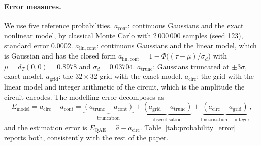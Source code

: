 \documentclass[pdflatex,sn-mathphys-num]{sn-jnl}%
\theoremstyle{thmstyleone}%
\theoremstyle{thmstyletwo}%
\theoremstyle{thmstylethree}%
\begin{document}
\paragraph{Error measures.} We use five reference probabilities. $a_{\mathrm{cont}}$: continuous Gaussians and the exact nonlinear model, by classical Monte Carlo with 2\,000\,000 samples (seed 123), standard error 0.0002. $a_{\mathrm{lin,cont}}$: continuous Gaussians and the linear model, which is Gaussian and has the closed form $a_{\mathrm{lin,cont}}=1-\Phi\bigl((\tau-\mu)/\sigma_d\bigr)$ with $\mu=d_T(0,0)=0.8978$ and $\sigma_d=0.03704$. $a_{\mathrm{trunc}}$: Gaussians truncated at $\pm3\sigma$, exact model. $a_{\mathrm{grid}}$: the $32\times32$ grid with the exact model. $a_{\mathrm{circ}}$: the grid with the linear model and integer arithmetic of the circuit, which is the amplitude the circuit encodes. The modelling error decomposes as
\begin{equation}
E_{\mathrm{model}}=a_{\mathrm{circ}}-a_{\mathrm{cont}}=\underbrace{(a_{\mathrm{trunc}}-a_{\mathrm{cont}})}_{\text{truncation}}+\underbrace{(a_{\mathrm{grid}}-a_{\mathrm{trunc}})}_{\text{discretisation}}+\underbrace{(a_{\mathrm{circ}}-a_{\mathrm{grid}})}_{\text{linearisation + integer}},
\end{equation}
and the estimation error is $E_{\mathrm{QAE}}=\hat a-a_{\mathrm{circ}}$. Table~\ref{tab:probability_error} reports both, consistently with the rest of the paper.
\end{document}

